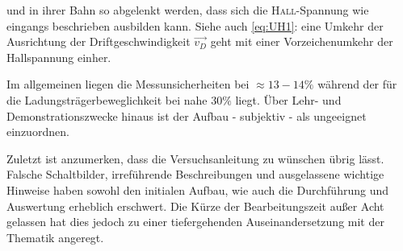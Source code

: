 und in ihrer Bahn so abgelenkt werden, dass sich die \textsc{Hall}-Spannung wie eingangs beschrieben ausbilden kann. Siehe auch
\cref{eq:UH1}: eine Umkehr der Ausrichtung der Driftgeschwindigkeit \(\vec{v_D}\) geht mit einer Vorzeichenumkehr der Hallspannung
einher.
\par\medskip
Im allgemeinen liegen die Messunsicherheiten bei \(\approx 13-14\%\) während der für die Ladungsträgerbeweglichkeit bei
nahe \(30\%\) liegt. Über Lehr- und Demonstrationszwecke hinaus ist der Aufbau - subjektiv - als ungeeignet einzuordnen.
\par\bigskip
Zuletzt ist anzumerken, dass die Versuchsanleitung zu wünschen übrig lässt. Falsche Schaltbilder, irreführende Beschreibungen
und ausgelassene wichtige Hinweise haben sowohl den initialen Aufbau, wie auch die Durchführung und Auswertung erheblich
erschwert. Die Kürze der Bearbeitungszeit außer Acht gelassen hat dies jedoch zu einer tiefergehenden Auseinandersetzung
mit der Thematik angeregt.